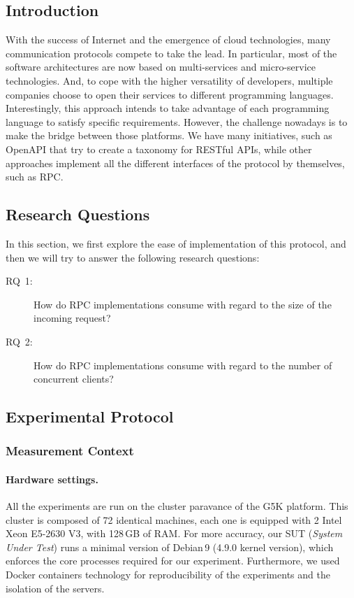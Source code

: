 \subsection{Introduction}
With the success of Internet and the emergence of cloud technologies, many communication protocols compete to take the lead.
In particular, most of the software architectures are now based on multi-services and micro-service technologies.
And, to cope with the higher versatility of developers, multiple companies choose to open their services to different programming languages.
Interestingly, this approach intends to take advantage of each programming language to satisfy specific requirements.
However, the challenge nowadays is to make the bridge between those platforms.
We have many initiatives, such as OpenAPI that try to create a taxonomy for RESTful APIs, while other approaches implement all the different interfaces of the protocol by themselves, such as RPC.

\subsection{Research Questions}
In this section, we first explore the ease of implementation of this protocol, and then we will try to answer the following research questions:
\begin{description}
    \item[\textsc{RQ}~1:] How do RPC implementations consume with regard to the size of the incoming request?
    \item[\textsc{RQ}~2:] How do RPC implementations consume with regard to the number of concurrent clients?
\end{description}

\subsection{Experimental Protocol}
\subsubsection{Measurement Context}
\paragraph{Hardware settings.}
All the experiments are run on the cluster \textsf{paravance} of the G5K platform.
This cluster is composed of 72 identical machines, each one is equipped with 2 Intel Xeon E5-2630 V3, with 128\,GB of RAM.
For more accuracy, our SUT (\emph{System Under Test}) runs a minimal version of Debian\,9 (4.9.0 kernel version), which enforces the core processes required for our experiment.
Furthermore, we used Docker containers technology for reproducibility of the experiments and the isolation of the servers.

